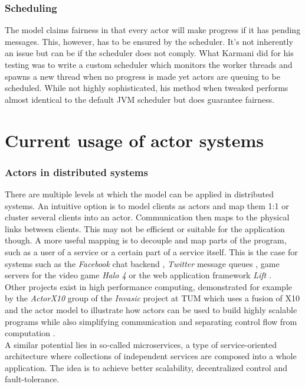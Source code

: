 \documentclass[A4]{article}
\begin{document}
\subsubsection{Scheduling}
The model claims fairness in that every actor will make progress if it has pending messages. This, however, has to be ensured by the scheduler. It's not inherently an issue but can be if the scheduler does not comply. What Karmani did for his testing was to write a custom scheduler which monitors the worker threads and spawns a new thread when no progress is made yet actors are queuing to be scheduled. While not highly sophisticated, his method when tweaked performs almost identical to the default JVM scheduler but does guarantee fairness. \cite[p.~9]{conf/pppj/KarmaniSA09}

\section{Current usage of actor systems}
\subsubsection{Actors in distributed systems}
There are multiple levels at which the model can be applied in distributed systems. An intuitive option is to model clients as actors and map them 1:1 or cluster several clients into an actor. Communication then maps to the physical links between clients. This may not be efficient or suitable for the application though. A more useful mapping is to decouple and map parts of the program, such as a user of a service or a certain part of a service itself. This is the case for systems such as the {\it Facebook} chat backend \cite{Facebook}, {\it Twitter} message queues \cite{Twitter}, game servers for the video game {\it Halo 4} \cite{Halo4} or the web application framework {\it Lift} \cite[p.~14]{Agha2016:2}. \\
Other projects exist in high performance computing, demonstrated for example by the {\it ActorX10} group of the {\it Invasic} project at TUM which uses a fusion of X10 and the actor model to illustrate how actors can be used to build highly scalable programs while also simplifying communication and separating control flow from computation \cite[p.~4]{Roloff:2016:AAL:2931028.2931033}. \\
A similar potential lies in so-called microservices, a type of service-oriented architecture where collections of independent services are composed into a whole application. The idea is to achieve better scalability, decentralized control and fault-tolerance. \cite{MicroS}
\end{document}
